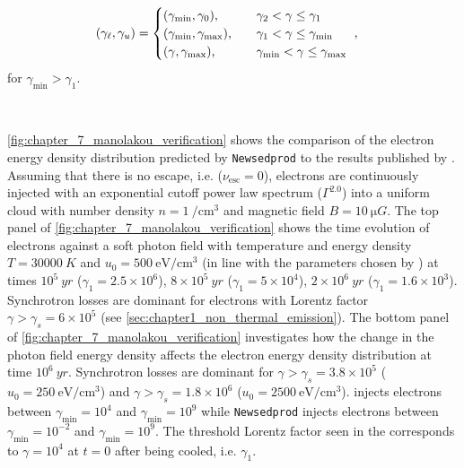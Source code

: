 \begin{equation}
    \begin{aligned}
  	  \qty(\gamma_\ell,\gamma_u)&=
  	  \begin{cases}
  		  \qty(\gamma_\text{min},\gamma_0)\text{,}\quad & \gamma_2<\gamma\leq\gamma_1 \\
   		 \qty(\gamma_\text{min},\gamma_\text{max})\text{,}\quad & \gamma_1<\gamma\leq\gamma_\text{min} \\
   		 \qty(\gamma,\gamma_\text{max})\text{,}\quad & \gamma_\text{min}<\gamma\leq\gamma_\text{max}
    	\end{cases}\text{ ,}
    \end{aligned}
\end{equation}
\noindent for $\gamma_\text{min}>\gamma_1$.
\par~\par
\autoref{fig:chapter_7_manolakou_verification} shows the comparison of the electron energy density distribution predicted by {\tt Newsedprod} to the results published by \cite{2007A&A...474..689M}. Assuming that there is no escape, i.e. ($\nu_\text{esc}=0$), electrons are continuously injected with an exponential cutoff power law spectrum ($\Gamma^{2.0}$) into a uniform cloud with number density $n=1~\si{\per\centi\meter\cubed}$ and magnetic field $B=10~\si{\micro G}$. The top panel of \autoref{fig:chapter_7_manolakou_verification} shows the time evolution of electrons against a soft photon field with temperature and energy density $T=30000~\si{K}$ and $u_0=500~\si{\electronvolt\per\centi\meter\cubed}$ (in line with the parameters chosen by \cite{2007A&A...474..689M}) at times $10^5~\si{yr}$ ($\gamma_1=2.5\times 10^6$), $8\times 10^5~\si{yr}$ ($\gamma_1=5\times 10^4$), $2\times 10^6~\si{yr}$ ($\gamma_1=1.6\times 10^3$). Synchrotron losses are dominant for electrons with Lorentz factor $\gamma>\gamma_s = 6\times 10^5$ (see \autoref{sec:chapter1_non_thermal_emission}). The bottom panel of \autoref{fig:chapter_7_manolakou_verification} investigates how the change in the photon field energy density affects the electron energy density distribution at time $10^6~\si{yr}$. Synchrotron losses are dominant for $\gamma>\gamma_s=3.8\times 10^5$ ($u_0=250~\si{\electronvolt\per\centi\meter\cubed}$) and $\gamma>\gamma_s=1.8\times 10^6$ ($u_0=2500~\si{\electronvolt\per\centi\meter\cubed}$).  \cite{2007A&A...474..689M} injects electrons between $\gamma_\text{min}=10^4$ and $\gamma_\text{min}=10^9$ while {\tt Newsedprod} injects electrons between $\gamma_\text{min}=10^{-2}$ and $\gamma_\text{min}=10^9$. The threshold Lorentz factor seen in the \cite{2007A&A...474..689M} corresponds to $\gamma=10^4$ at $t=0$ after being cooled, i.e. $\gamma_1$.

